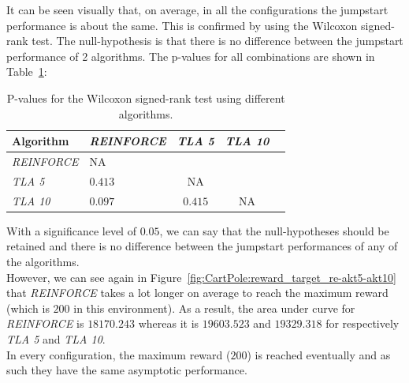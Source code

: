 It can be seen visually that, on average, in all the configurations the jumpstart performance is about the same. This is confirmed by using the Wilcoxon signed-rank test. The null-hypothesis is that there is no difference between the jumpstart performance of 2 algorithms.
The p-values for all combinations are shown in Table~\ref{tab:nosparse:pvalues}:
\begin{table}[htb]
    \centering
    \begin{tabular}{llccc}
    \hline
    Algorithm & \textit{REINFORCE} & \textit{TLA 5} & \textit{TLA 10} \\
    \hline
       \textit{REINFORCE}  & NA & & \\
       \textit{TLA 5} & $0.413$ & NA & \\
       \textit{TLA 10} & $0.097$ & $0.415$ & NA \\
    \hline
    \end{tabular}
    \caption{P-values for the Wilcoxon signed-rank test using different algorithms.}
    \label{tab:nosparse:pvalues}
\end{table}

With a significance level of $0.05$, we can say that the null-hypotheses should be retained and there is no difference between the jumpstart performances of any of the algorithms.\\
However, we can see again in Figure~\ref{fig:CartPole:reward_target_re-akt5-akt10} that \textit{REINFORCE} takes a lot longer on average to reach the maximum reward (which is $200$ in this environment). As a result, the area under curve for \textit{REINFORCE} is $18170.243$ whereas it is $19603.523$ and $19329.318$ for respectively \textit{TLA 5} and \textit{TLA 10}.\\
In every configuration, the maximum reward ($200$) is reached eventually and as such they have the same asymptotic performance.\\


